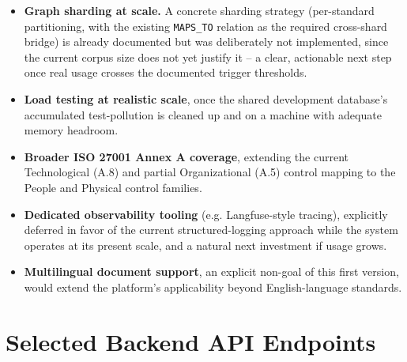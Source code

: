 \documentclass[12pt,a4paper]{report}
\renewcommand{\thechapter}{\Roman{chapter}}
\begin{document}
\begin{itemize}
  \item \textbf{Graph sharding at scale.} A concrete sharding strategy
        (per-standard partitioning, with the existing \texttt{MAPS\_TO}
        relation as the required cross-shard bridge) is already documented
        but was deliberately not implemented, since the current corpus size
        does not yet justify it -- a clear, actionable next step once real
        usage crosses the documented trigger thresholds.
  \item \textbf{Load testing at realistic scale}, once the shared
        development database's accumulated test-pollution is cleaned up and
        on a machine with adequate memory headroom.
  \item \textbf{Broader ISO 27001 Annex A coverage}, extending the current
        Technological (A.8) and partial Organizational (A.5) control
        mapping to the People and Physical control families.
  \item \textbf{Dedicated observability tooling} (e.g. Langfuse-style
        tracing), explicitly deferred in favor of the current
        structured-logging approach while the system operates at its
        present scale, and a natural next investment if usage grows.
  \item \textbf{Multilingual document support}, an explicit non-goal of
        this first version, would extend the platform's applicability
        beyond English-language standards.
\end{itemize}

\renewcommand{\thechapter}{\Alph{chapter}}
\setcounter{chapter}{0}

\chapter{Selected Backend API Endpoints}
\end{document}
